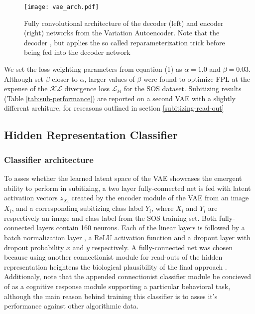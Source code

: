 \documentclass[twocolumn]{article}
\begin{document}
\begin{figure}
\centering
\texttt{[image: vae\_arch.pdf]}
\caption{Fully convolutional architecture of the decoder (left) and encoder (right) networks from the Variation Autoencoder. Note that the decoder , but applies the so called reparameterization trick \citep{kingma2013auto} before being fed into the decoder network}
\label{fig:vae-arch}
\end{figure}

We set the loss weighting parameters from equation (1) as \(\alpha=1.0\) and \(\beta=0.03\). Although \citet{hou2017deep} set \(\beta\) closer to \(\alpha\), larger values of \(\beta\) were found to optimize FPL  at the expense of the \(\mathcal{KL}\) divergence loss \(\mathcal{L}_{kl}\) for the SOS dataset. Subitizing results (Table \ref{tab:sub-performance}) are reported on a second VAE with a slightly different architure, for reseasons outlined in section \ref{subitizing-read-out}

\hypertarget{readout}{%
\subsection{Hidden Representation Classifier}\label{readout}}

\hypertarget{classifierarch}{%
\subsubsection{Classifier architecture}\label{classifierarch}}

To asses whether the learned latent space of the VAE showcases the
emergent ability to perform in subitizing, a two layer fully-connected
net is fed with latent activation vectors \(z_{X_i}\) created by the
encoder module of the VAE from an image \(X_i\), and a corresponding
subitizing class label \(Y_i\), where \(X_i\) and \(Y_i\) are
respectively an image and class label from the SOS training set. Both
fully-connected layers contain 160 neurons. Each of the linear layers is
followed by a batch normalization layer \citep{ioffe2015batch}, a ReLU
activation function and a dropout layer \citep{srivastava2014dropout}
with dropout probability \(x\) and \(y\) respectively. A fully-connected
net was chosen because using another connectionist module for read-outs
of the hidden representation heightens the biological plausibility of
the final approach \citep{zorzi2013modeling}. Additionaly,
\citet{zorzi2013modeling} note that the appended connectionist
classifier module be concieved of as a cognitive response module
supporting a particular behavioral task, although the main reason behind
training this classifier is to asses it's performance against other
algorithmic data.
\end{document}
